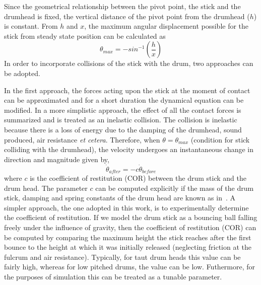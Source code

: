 \documentclass[final,1p,times]{elsarticle}
\begin{document}
Since the geometrical relationship between the pivot point, the stick and
the drumhead is fixed, the vertical distance of the pivot point from the drumhead ($h$) is constant. From $h$ and $x$, the maximum angular displacement possible for the stick from steady state position can be calculated as
\begin{equation}
\theta_{max} = -sin^{-1}\left(\frac{h}{x}\right)
\end{equation}
In order to incorporate collisions of the stick with the drum, two approaches can be adopted. 

In the first approach, the forces acting upon the
stick at the moment of contact can be approximated and for a short duration the dynamical equation can be modified. In a more simplistic approach, the effect of all the contact forces is summarized and is treated as an inelastic collision. The collision is inelastic because there is a loss of energy due to the damping of the drumhead, sound produced, air resistance \textit{et cetera}. 
Therefore, when $\theta = \theta_{max}$ (condition for stick colliding with the drumhead), the velocity undergoes an instantaneous change in direction and magnitude given by,
\begin{equation}\label{eq6}
\dot{\theta}_{after} = -c\dot{\theta}_{before}
\end{equation} 
where $c$ is the coefficient of restitution (COR) between the drum stick and the drum head. The parameter $c$ can be computed explicitly if the mass of the drum stick, damping and spring constants of the drum head are known as in~\cite{berdahl2007physically}. A simpler approach, the one adopted in this work, is to experimentally determine the coefficient of restitution. If we model the drum stick as a bouncing ball falling freely under the influence of gravity, then the coefficient of restitution (COR) can be computed by comparing the maximum height the stick reaches after the first bounce to the height at which it was initially released (neglecting friction at the fulcrum and air resistance). Typically, for taut drum heads this value can be fairly high, whereas for low pitched drums, the value can be low. Futhermore, for the purposes of simulation this can be treated as a tunable parameter. 
\end{document}
